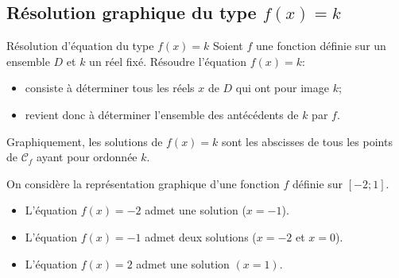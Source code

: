 \documentclass[11pt]{article}
\newcommand{\Cf}{\mathscr{C}_f}
\begin{document}
\subsection{Résolution graphique du type $f(x)=k$}
\begin{defi}{Résolution d'équation du type $f(x)=k$}
  Soient $f$ une fonction définie sur un ensemble $D$ et $k$ un réel fixé.
  Résoudre l'équation $f(x)=k$:
  \begin{itemize}
    \item consiste à déterminer tous les réels $x$ de $D$ qui ont pour image $k$;
    \item revient donc à déterminer l'ensemble des antécédents de $k$ par $f$.
  \end{itemize}
\end{defi}
\begin{prop}
  Graphiquement, les solutions de $f(x)=k$ sont les abscisses de tous les points
  de $\Cf$ ayant pour ordonnée $k$.
\end{prop}
\begin{exemple}
  \begin{minipage}{.6\textwidth}
    On considère la représentation graphique d'une fonction $f$ définie sur
    $\left[ -2;1 \right]$.
    \begin{itemize}
      \item L'équation $f(x)=-2$ admet une solution ($x=-1$).
      \item L'équation $f(x)=-1$ admet deux solutions ($x=-2$ et $x=0$).
      \item L'équation $f(x)=2$ admet une solution $(x=1)$.
    \end{itemize}
  \end{minipage}
  \begin{minipage}{.4\textwidth}
    \begin{center}
    \end{center}
  \end{minipage}
\end{exemple}
\end{document}
